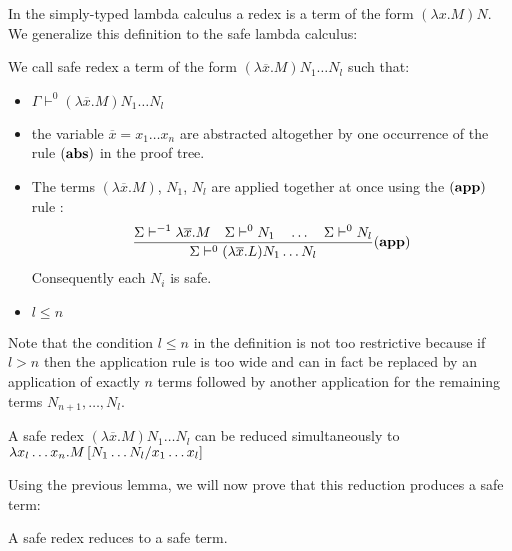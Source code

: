 In the simply-typed lambda calculus a redex is a term of the form
$(\lambda x . M) N$. We generalize this definition to the safe
lambda calculus:
\begin{dfn}
We call safe redex a term of the form $(\lambda \overline{x} . M)
N_1 \ldots N_l$ such that:
\begin{itemize}
\item $ \Gamma \vdash^0 (\lambda \overline{x} . M) N_1 \ldots N_l $
\item the variable $\overline{x}=x_1\ldots x_n$ are abstracted altogether by one occurrence of the rule $\mathbf{(abs)}$ in the proof tree.
\item The terms $(\lambda \overline{x} . M)$, $N_1$, $N_l$ are applied together at once using the $\mathbf{(app)}$ rule :
$$   \frac{\displaystyle 
            \Sigma \vdash^{-1} \lambda \overline{x} . M
            \quad
            \Sigma \vdash^0 N_1         \quad \ldots \quad \Sigma \vdash^0 N_l
    }{
       \Sigma \vdash^0 (\lambda \overline{x} . L) N_1 \ldots N_l
    } (\mathbf{app})
$$
Consequently each $N_i$ is safe.

\item $l\leq n$
\end{itemize}
\end{dfn}

Note that the condition $l\leq n$ in the definition is not too
restrictive because if $l>n$ then the application rule is too wide
and can in fact be replaced by an application of exactly $n$ terms
followed by another application for the remaining terms $N_{n+1},
\ldots, N_l$.

A safe redex $(\lambda \overline{x} . M) N_1 \ldots N_l$ can be
reduced simultaneously to $\lambda x_l \ldots x_n . M \left[ N_1
\ldots N_l/x_1 \ldots x_l \right]$

Using the previous lemma, we will now prove that this reduction
produces a safe term:

\begin{lem}
\label{lem:safereduction} A safe redex reduces to a safe term.
\end{lem}

